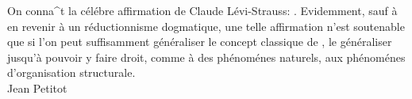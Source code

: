 \begin{frquote}On conna\^{\inodot}t la c\'{e}l\'{e}bre 
affirmation de Claude L\'{e}vi-Strauss:
.  Evidemment, sauf 
\`{a} en revenir \`{a} un r\'{e}ductionnisme dogmatique, une telle
affirmation n'est soutenable que si l'on peut suffisamment 
g\'{e}n\'{e}raliser le concept
classique de , 
le g\'{e}n\'{e}raliser jusqu'\`{a} pouvoir y faire droit, 
comme \`{a} des ph\'{e}nom\'{e}nes naturels, aux 
ph\'{e}nom\'{e}nes d'organisation structurale. 
\\ \longdash{} Jean Petitot \cite[p. 1]{PetitotSyntaxe}
\end{frquote}
